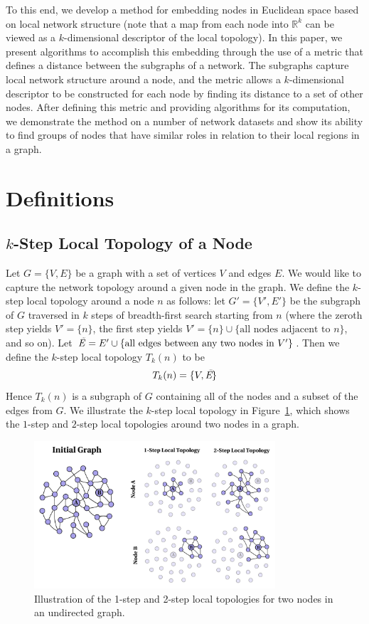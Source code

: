 \documentclass{article}
\begin{document}
To this end, we develop a method for embedding nodes in Euclidean space based on local network structure (note that a map from each node into $\mathbb{R}^{k}$ can be viewed as a $k$-dimensional descriptor of the local topology). In this paper, we present algorithms to accomplish this embedding through the use of a metric that defines a distance between the subgraphs of a network. The subgraphs capture local network structure around a node, and the metric allows a $k$-dimensional descriptor to be constructed for each node by finding its distance to a set of other nodes. After defining this metric and providing algorithms for its computation, we demonstrate the method on a number of network datasets and show its ability to find groups of nodes that have similar roles in relation to their local regions in a graph. 


\section{Definitions}
\label{sec:defs}

\subsection{$k$-Step Local Topology of a Node}
Let $G = \{V,E\}$ be a graph with a set of vertices $V$ and edges $E$. We would like to capture the network topology around a given node in the graph. We define the $k$-step local topology around a node $n$ as follows: let $G' = \{ V',E' \}$ be the subgraph of $G$ traversed in $k$ steps of breadth-first search starting from $n$ (where the zeroth step yields $V' = \{ n \}$, the first step yields $V' = \{ n \} \cup \{ \text{all nodes adjacent to } n \} $, and so on). Let $ \text{\emph{\~{E}}} = E' \cup \{\text{all edges between any two nodes in } V' \}$. Then we define the $k$-step local topology $T_{k}(n)$ to be
\begin{equation}
T_{k}(n) = \{ V, \emph{\text{\~{E}}} \}
\end{equation}
Hence $T_{k}(n)$ is a subgraph of $G$ containing all of the nodes and a subset of the edges from $G$. We illustrate the $k$-step local topology in Figure~\ref{fig:localTopology}, which shows the $1$-step and $2$-step local topologies around two nodes in a graph.
\begin{figure}[h!tbp]
  \centering               
  \includegraphics[width=0.8\textwidth]{fig/fig1.pdf}
  \caption{Illustration of the 1-step and 2-step local topologies for two nodes in an undirected graph.}
  \label{fig:localTopology}
\end{figure}
\end{document}
